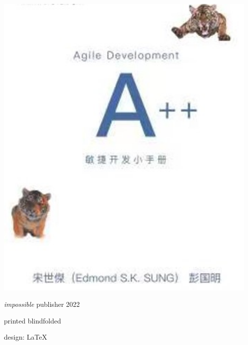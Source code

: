 \documentclass{book}        %
\date{}
\begin{document}

\begin{titlepage}\thispagestyle{empty} \vspace*{3em}
\includegraphics[width=13cm]{aBookCover2latexScreenshot2023-03-08130046.jpg}
\clearpage\newpage \thispagestyle{empty} \mbox{} \cleardoublepage

\thispagestyle{empty} \cleardoublepage

\thispagestyle{empty} \vspace*{\fill} \parbox{.8\textwidth}{\raggedright \scriptsize
\textit{impossible} publisher 2022

printed blindfolded

design: \LaTeX
}
\end{titlepage}
\clearpage \thispagestyle{empty}\cleardoublepage
\newpage %
\end{document}
